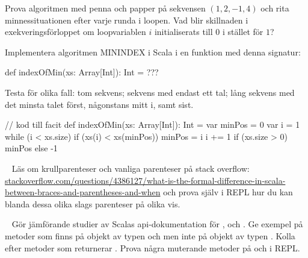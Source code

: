 \Subtask Prova algoritmen med penna och papper på sekvensen $(1, 2, -1, 4)$ och rita minnessituationen efter varje runda i loopen. Vad blir skillnaden i exekveringsförloppet om loopvariablen $i$  initialiserats till $0$ i stället för $1$?

\Subtask Implementera algoritmen MININDEX i Scala i en funktion med denna signatur:
\begin{Code}
def indexOfMin(xs: Array[Int]): Int = ???
\end{Code}
Testa för olika fall: tom sekvens; sekvens med endast ett tal; lång sekvens med det minsta talet först, någonstans mitt i, samt sist.

\begin{Code}
// kod till facit
def indexOfMin(xs: Array[Int]): Int = {
  var minPos = 0
  var i = 1
  while (i < xs.size) {
    if (xs(i) < xs(minPos)) minPos = i
    i += 1
  }
  if (xs.size > 0) minPos else -1
}


\end{Code}

\newpage

\AdvancedTasks %


\SOLUTION


\QUESTEND







\QUESTBEGIN

\Task  \what~ Läs om krullparenteser och vanliga parenteser på stack overflow: \\ \href{http://stackoverflow.com/questions/4386127/what-is-the-formal-difference-in-scala-between-braces-and-parentheses-and-when}{stackoverflow.com/questions/4386127/what-is-the-formal-difference-in-scala-between-braces-and-parentheses-and-when} och prova själv i REPL hur du kan blanda dessa olika slags parenteser på olika vis.

\SOLUTION


\QUESTEND







\QUESTBEGIN

\Task  \what~ Gör jämförande studier av Scalas api-dokumentation för ,  och . Ge exempel på metoder som finns på objekt av typen  och  men inte på objekt av typen .  Kolla efter metoder som returnerar . Prova några muterande metoder på  och  i REPL.

